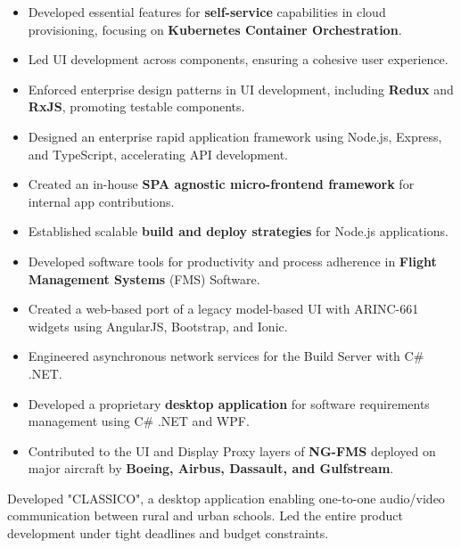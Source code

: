 \documentclass[10pt,a4paper,ragged2e,withhyper]{altacv}
\begin{document}
\begin{itemize}
  \item Developed essential features for \textbf{self-service} capabilities in cloud provisioning, focusing on \textbf{Kubernetes Container Orchestration}.
  \item Led UI development across components, ensuring a cohesive user experience.
  \item Enforced enterprise design patterns in UI development, including \textbf{Redux} and \textbf{RxJS}, promoting testable components.
  \item Designed an enterprise rapid application framework using Node.js, Express, and TypeScript, accelerating API development.
  \item Created an in-house \textbf{SPA agnostic micro-frontend framework} for internal app contributions.
  \item Established scalable \textbf{build and deploy strategies} for Node.js applications.
\end{itemize}

\divider

\begin{itemize}
  \item Developed software tools for productivity and process adherence in \textbf{Flight Management Systems} (FMS) Software.
  \item Created a web-based port of a legacy model-based UI with ARINC-661 widgets using AngularJS, Bootstrap, and Ionic.
  \item Engineered asynchronous network services for the Build Server with C\# .NET.
  \item Developed a proprietary \textbf{desktop application} for software requirements management using C\# .NET and WPF.
  \item Contributed to the UI and Display Proxy layers of \textbf{NG-FMS} deployed on major aircraft by \textbf{Boeing, Airbus, Dassault, and Gulfstream}.
\end{itemize}


\divider

Developed "CLASSICO", a desktop application enabling one-to-one audio/video communication between rural and urban schools. Led the entire product development under tight deadlines and budget constraints.
\end{document}
